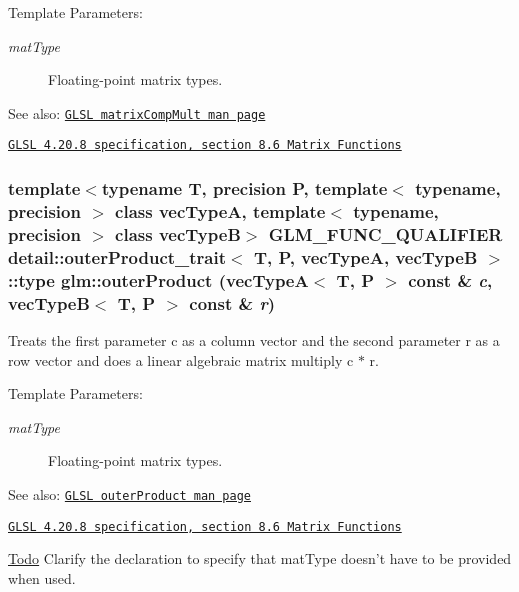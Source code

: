 \begin{Desc}
\item[Template Parameters:]
\begin{description}
\item[{\em matType}]Floating-point matrix types.\end{description}
\end{Desc}
\begin{Desc}
\item[See also:]\href{http://www.opengl.org/sdk/docs/manglsl/xhtml/matrixCompMult.xml}{\tt GLSL matrixCompMult man page} 

\href{http://www.opengl.org/registry/doc/GLSLangSpec.4.20.8.pdf}{\tt GLSL 4.20.8 specification, section 8.6 Matrix Functions} \end{Desc}
\hypertarget{group__core__func__matrix_g47818f9809502f7a975a2c43a61fedb3}{
\subsubsection[outerProduct]{\setlength{\rightskip}{0pt plus 5cm}template$<$typename T, precision P, template$<$ typename, precision $>$ class vecTypeA, template$<$ typename, precision $>$ class vecTypeB$>$ GLM\_\-FUNC\_\-QUALIFIER detail::outerProduct\_\-trait$<$ T, P, vecTypeA, vecTypeB $>$::type glm::outerProduct (vecTypeA$<$ T, P $>$ const \& {\em c}, \/  vecTypeB$<$ T, P $>$ const \& {\em r})}}
\label{group__core__func__matrix_g47818f9809502f7a975a2c43a61fedb3}


Treats the first parameter c as a column vector and the second parameter r as a row vector and does a linear algebraic matrix multiply c $\ast$ r.

\begin{Desc}
\item[Template Parameters:]
\begin{description}
\item[{\em matType}]Floating-point matrix types.\end{description}
\end{Desc}
\begin{Desc}
\item[See also:]\href{http://www.opengl.org/sdk/docs/manglsl/xhtml/outerProduct.xml}{\tt GLSL outerProduct man page} 

\href{http://www.opengl.org/registry/doc/GLSLangSpec.4.20.8.pdf}{\tt GLSL 4.20.8 specification, section 8.6 Matrix Functions}\end{Desc}
\begin{Desc}
\item[\hyperlink{todo__todo000048}{Todo}]Clarify the declaration to specify that matType doesn't have to be provided when used. \end{Desc}
